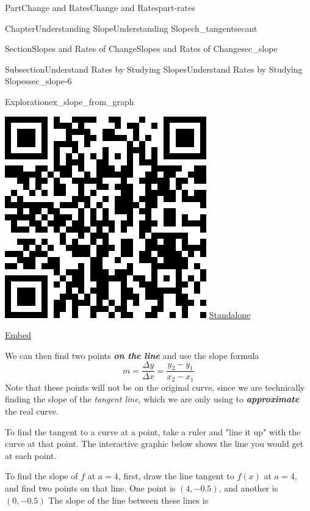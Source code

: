\documentclass[oneside,10pt,]{tufte-book}
\newcommand{\alert}[1]{\textbf{\textit{#1}}}
\numberwithin{equation}{chapter}
\begin{document}
\begin{partptx}{Part}{Change and Rates}{}{Change and Rates}{}{}{part-rates}
\begin{chapterptx}{Chapter}{Understanding Slope}{}{Understanding Slope}{}{}{ch_tangentsecant}
\begin{sectionptx}{Section}{Slopes and Rates of Change}{}{Slopes and Rates of Change}{}{}{sec_slope}
\begin{subsectionptx}{Subsection}{Understand Rates by Studying Slopes}{}{Understand Rates by Studying Slopes}{}{}{sec_slope-6}
\begin{exploration}{Exploration}{}{ex_slope_from_graph}
\begin{enumerate}[font=\bfseries,label=(\alph*),ref=\alph*]
\begin{sidebyside}{2}{0.075}{0.075}{0.17}
\begin{sbspanel}{0.21}
\includegraphics[width=\linewidth]{generated/qrcode/ex_slope_from_graph-5-2-2.png}
\href{http://webwork.bridgew.edu/oer/functions_at_work/ex_slope_from_graph-5-2-2.html}{Standalone}%
\par
\href{http://webwork.bridgew.edu/oer/functions_at_work/ex_slope_from_graph-5-2-2-if.html}{Embed}%
\end{sbspanel}%
\end{sidebyside}%
\par
We can then find two points \alert{on the line} and use the slope formula%
\begin{equation*}
m = \dfrac{\Delta y}{\Delta x} = \dfrac{y_2-y_1}{x_2-x_1}
\end{equation*}
Note that these points will not be on the original curve, since we are technically finding the slope of the \emph{tangent line}, which we are only using to \alert{approximate} the real curve.%
\par
To find the tangent to a curve at a point, take a ruler and "line it up" with the curve at that point. The interactive graphic below shows the line you would get at each point.%
\par
To find the slope of \(f\) at \(a=4\), first, draw the line tangent to \(f(x)\) at \(a=4\), and find two points on that line. One point is \((4,-0.5)\), and another is \((0,-0.5)\) The slope of the line between these lines is%

\end{enumerate}
\end{exploration}
\end{subsectionptx}
\end{sectionptx}
\end{chapterptx}
\end{partptx}
\end{document}
